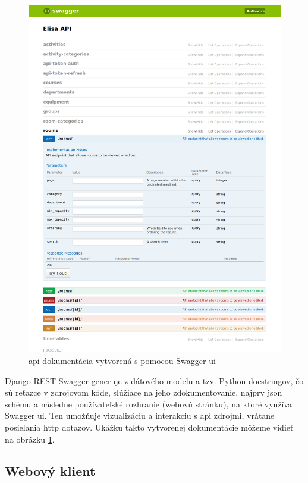 \begin{figure}
  \centering
  \includegraphics[width=\textwidth]{figures/swagger-ui.png}
  \caption{\label{fig:swagger_ui} \acrshort{api} dokumentácia vytvorená s
    pomocou Swagger \acrshort{ui}}
\end{figure}

Django REST Swagger generuje z dátového modelu a tzv. Python docstringov, čo sú
reťazce v zdrojovom kóde, slúžiace na jeho zdokumentovanie, najprv
\acrshort{json} schému a následne používateľské rozhranie (webovú stránku), na
ktoré využíva Swagger \acrshort{ui}. Ten umožňuje vizualizáciu a interakciu s
\acrshort{api} zdrojmi, vrátane posielania \acrshort{http} dotazov. Ukážku takto
vytvorenej dokumentácie môžeme vidieť na obrázku \ref{fig:swagger_ui}.

\subsection{Webový klient}
\label{subsec:impl_client}

